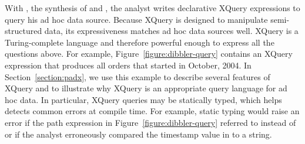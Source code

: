 With \padx{}, the synthesis of \pads{} and \Galax{}, the analyst
writes declarative XQuery expressions to query his ad hoc data source.
Because XQuery is designed to manipulate semi-structured data, its
expressiveness matches ad hoc data sources well.  XQuery is a
Turing-complete language and therefore powerful
enough to express all the questions above.  For example,
Figure~\ref{figure:dibbler-query} contains an XQuery expression that
produces all orders that started in October, 2004.  In
Section~\ref{section:padx}, we use this example to describe several
features of XQuery and to illustrate why XQuery is an appropriate
query language for ad hoc data.  In particular, XQuery queries may be
statically typed, which helps detects common errors at compile time.
For example, static typing would raise an error if the path expression
in Figure~\ref{figure:dibbler-query} referred to  instead
of  or if the analyst erroneously compared the timestamp
value in  to a string.
